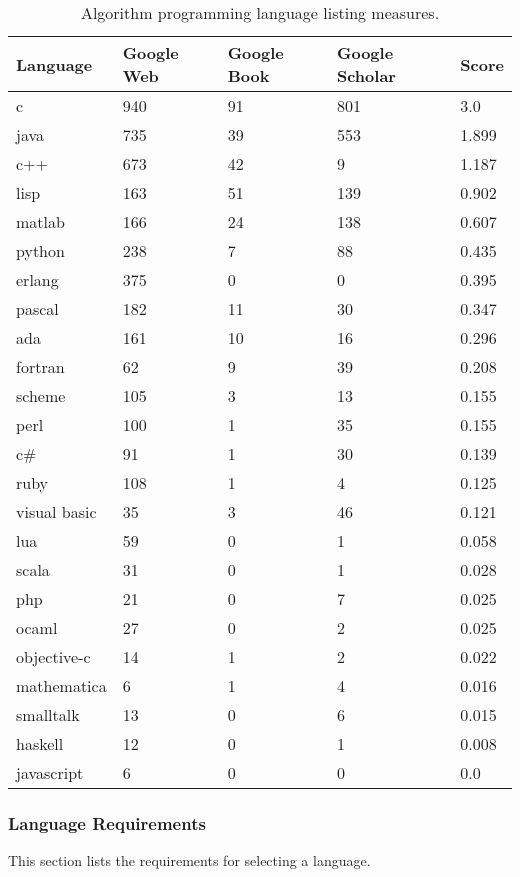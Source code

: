 \documentclass[a4paper, 11pt]{article}
\begin{document}
\begin{table}[ht]
	\centering
		\begin{tabularx}{\textwidth}{lXXXX}
		\toprule
		\textbf{Language} & \textbf{Google Web} & \textbf{Google Book} & \textbf{Google Scholar} & \textbf{Score} \\ 
		\toprule
		c & 940 & 91 & 801 & 3.0 \\
		java & 735 & 39 & 553 & 1.899 \\
		c++ & 673 & 42 & 9 & 1.187 \\
		lisp & 163 & 51 & 139 & 0.902 \\
		matlab & 166 & 24 & 138 & 0.607 \\
		python & 238 & 7 & 88 & 0.435 \\
		erlang & 375 & 0 & 0 & 0.395 \\
		pascal & 182 & 11 & 30 & 0.347 \\
		ada & 161 & 10 & 16 & 0.296 \\
		fortran & 62 & 9 & 39 & 0.208 \\
		scheme & 105 & 3 & 13 & 0.155 \\
		perl & 100 & 1 & 35 & 0.155 \\
		c\# & 91 & 1 & 30 & 0.139 \\
		ruby & 108 & 1 & 4 & 0.125 \\
		visual basic & 35 & 3 & 46 & 0.121 \\
		lua & 59 & 0 & 1 & 0.058 \\
		scala & 31 & 0 & 1 & 0.028 \\
		php & 21 & 0 & 7 & 0.025 \\
		ocaml & 27 & 0 & 2 & 0.025 \\
		objective-c & 14 & 1 & 2 & 0.022 \\
		mathematica & 6 & 1 & 4 & 0.016 \\
		smalltalk & 13 & 0 & 6 & 0.015 \\
		haskell & 12 & 0 & 1 & 0.008 \\
		javascript & 6 & 0 & 0 & 0.0 \\
		\bottomrule
		\end{tabularx}	
	\caption{Algorithm programming language listing measures.}
	\label{tab:results}
\end{table}

% 
% 
\subsubsection{Language Requirements}
\label{subsubsec:requirements}
This section lists the requirements for selecting a language.
\end{document}
